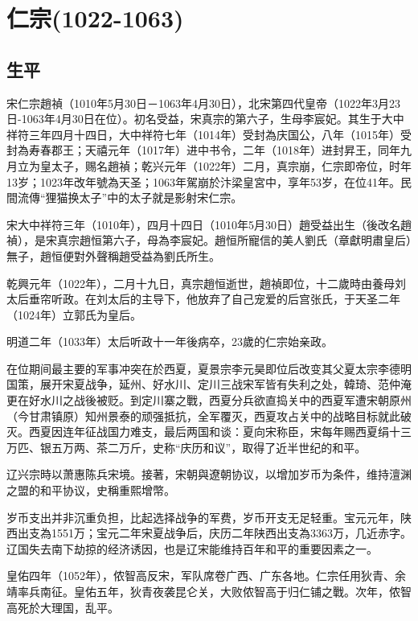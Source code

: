 
\section{仁宗\tiny(1022-1063)}

\subsection{生平}

宋仁宗趙禎（1010年5月30日－1063年4月30日），北宋第四代皇帝（1022年3月23日-1063年4月30日在位）。初名受益，宋真宗的第六子，生母李宸妃。其生于大中祥符三年四月十四日，大中祥符七年（1014年）受封為庆国公，八年（1015年）受封為寿春郡王；天禧元年（1017年）进中书令，二年（1018年）进封昇王，同年九月立为皇太子，赐名趙禎；乾兴元年（1022年）二月，真宗崩，仁宗即帝位，时年13岁；1023年改年號為天圣；1063年駕崩於汴梁皇宮中，享年53岁，在位41年。民間流傳“狸猫换太子”中的太子就是影射宋仁宗。

宋大中祥符三年（1010年），四月十四日（1010年5月30日）趙受益出生（後改名趙禎），是宋真宗趙恒第六子，母為李宸妃。趙恒所寵信的美人劉氏（章獻明肅皇后）無子，趙恒便對外聲稱趙受益為劉氏所生。

乾興元年（1022年），二月十九日，真宗趙恒逝世，趙禎即位，十二歲時由養母刘太后垂帘听政。在刘太后的主导下，他放弃了自己宠爱的后宫张氏，于天圣二年（1024年）立郭氏为皇后。

明道二年（1033年）太后听政十一年後病卒，23歲的仁宗始亲政。

在位期间最主要的军事冲突在於西夏，夏景宗李元昊即位后改变其父夏太宗李德明国策，展开宋夏战争，延州、好水川、定川三战宋军皆有失利之处，韓琦、范仲淹更在好水川之战後被贬。到定川寨之戰，西夏分兵欲直捣关中的西夏军遭宋朝原州（今甘肃镇原）知州景泰的顽强抵抗，全军覆灭，西夏攻占关中的战略目标就此破灭。西夏因连年征战国力难支，最后两国和谈：夏向宋称臣，宋每年赐西夏绢十三万匹、银五万两、茶二万斤，史称“庆历和议”，取得了近半世纪的和平。

辽兴宗時以萧惠陈兵宋境。接著，宋朝與遼朝协议，以增加岁币为条件，维持澶渊之盟的和平协议，史稱重熙增幣。

岁币支出并非沉重负担，比起选择战争的军费，岁币开支无足轻重。宝元元年，陕西出支為1551万；宝元二年宋夏战争后，庆历二年陕西出支為3363万，几近赤字。辽国失去南下劫掠的经济诱因，也是辽宋能维持百年和平的重要因素之一。

皇佑四年（1052年），侬智高反宋，军队席卷广西、广东各地。仁宗任用狄青、余靖率兵南征。皇佑五年，狄青夜袭昆仑关，大败侬智高于归仁铺之戰。次年，侬智高死於大理国，乱平。

